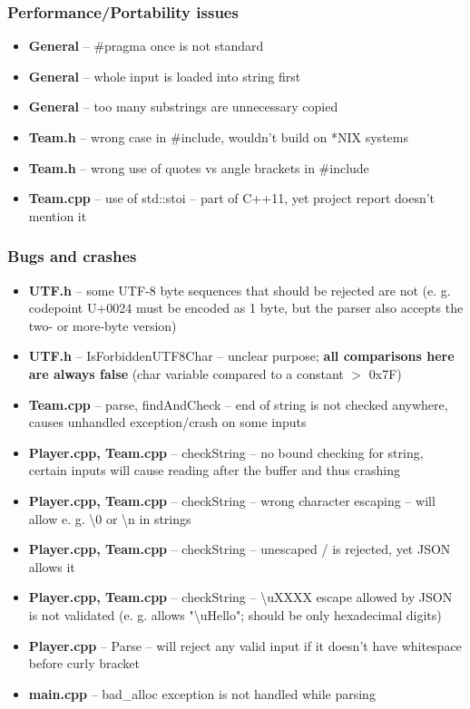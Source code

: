 \documentclass{beamer}
\begin{document}

\begin{frame}
\frametitle{Performance/Portability issues}

\begin{itemize}
\item \textbf{General} -- \#pragma once is not standard
\item \textbf{General} -- whole input is loaded into string first
\item \textbf{General} -- too many substrings are unnecessary copied
\item \textbf{Team.h} -- wrong case in \#include, wouldn't build on *NIX systems
\item \textbf{Team.h} -- wrong use of quotes vs angle brackets in \#include
\item \textbf{Team.cpp} -- use of std::stoi -- part of C++11, yet project report doesn't mention it
\end{itemize}

\end{frame}


\begin{frame}[allowframebreaks=0.8]
\frametitle{Bugs and crashes}

\begin{itemize}
\item \textbf{UTF.h} -- some UTF-8 byte sequences that should be rejected are not (e. g. codepoint U+0024 must be encoded as 1 byte, but the parser also accepts the two- or more-byte version)
\item \textbf{UTF.h} -- IsForbiddenUTF8Char -- unclear purpose; \textbf{all comparisons here are always false} (char variable compared to a constant $>$ 0x7F)
\item \textbf{Team.cpp} -- parse, findAndCheck -- end of string is not checked anywhere, causes unhandled exception/crash on some inputs
\item \textbf{Player.cpp, Team.cpp} -- checkString -- no bound checking for string, certain inputs will cause reading after the buffer and thus crashing
\item \textbf{Player.cpp, Team.cpp} -- checkString -- wrong character escaping -- will allow e. g. \textbackslash 0 or \textbackslash n in strings
\item \textbf{Player.cpp, Team.cpp} -- checkString -- unescaped / is rejected, yet JSON allows it
\item \textbf{Player.cpp, Team.cpp} -- checkString -- \textbackslash uXXXX escape allowed by JSON is not validated (e. g. allows "\textbackslash uHello"; should be only hexadecimal digits)
\item \textbf{Player.cpp} -- Parse -- will reject any valid input if it doesn't have whitespace before curly bracket
\item \textbf{main.cpp} -- bad\_alloc exception is not handled while parsing
\end{itemize}

\end{frame}
\end{document}
